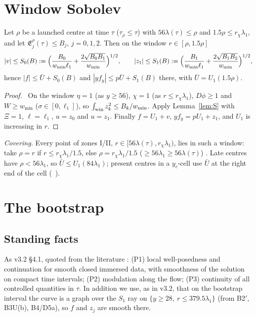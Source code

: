 \documentclass[11pt]{article}
\theoremstyle{definition}\newtheorem{definition}[theorem]{Definition}
\theoremstyle{remark}\newtheorem{remark}[theorem]{Remark}
\newcommand{\key}[1]{\texttt{\detokenize{#1}}}
\newcommand{\E}{\mathfrak E}\newcommand{\B}{\mathfrak B}\newcommand{\Bh}{\hat B}\newcommand{\Eh}{\hat E^A}
\begin{document}
\section{Window Sobolev}\label{sec:W}
\begin{lemma}\label{lem:W}
Let $\rho$ be a launched centre at time $\tau$ ($\tau_\rho\le\tau$) with $56\lambda(\tau)\le\rho$ and $1.5\rho\le r_\chi\lambda_1$, and let $\E^\rho_j(\tau)\le B_j$, $j=0,1,2$. Then on the window $r\in[\rho,1.5\rho]$
\[
|v|\le S_0(B):=\Bigl(\frac{B_0}{w_{\min}\ell_1}+\frac{2\sqrt{B_0B_1}}{w_{\min}}\Bigr)^{1/2},\qquad |z_1|\le S_1(B):=\Bigl(\frac{B_1}{w_{\min}\ell_1}+\frac{2\sqrt{B_1B_2}}{w_{\min}}\Bigr)^{1/2},
\]
hence $|f|\le\bar U+S_0(B)$ and $|yf_y|\le p\bar U+S_1(B)$ there, with $\bar U=U_1(1.5\rho)$.
\end{lemma}
\begin{proof}\tP\ On the window $\eta=1$ (as $y\ge56$), $\chi=1$ (as $r\le r_\chi\lambda_1$), $D\phi\ge1$ and $W\ge w_{\min}$ ($\sigma\in[0,\ell_1]$), so $\int_{\rm win}z_k^2\le B_k/w_{\min}$. Apply Lemma~\ref{lem:S} with $\Xi=1$, $\ell=\ell_1$, $u=z_0$ and $u=z_1$. Finally $f=U_1+v$, $yf_y=pU_1+z_1$, and $U_1$ is increasing in $r$.
\end{proof}
\noindent\emph{Covering.} Every point of zones I/II, $r\in[56\lambda(\tau),r_\chi\lambda_1)$, lies in such a window: take $\rho=r$ if $r\le r_\chi\lambda_1/1.5$, else $\rho=r_\chi\lambda_1/1.5$ ($\ge56\lambda_1\ge56\lambda(\tau)$) \tP. Late centres have $\rho<56\lambda_1$, so $\bar U\le U_1(84\lambda_1)$; present centres in a $y_c$-cell use $\bar U$ at the right end of the cell (\SU\ \key{margins.present_rows[].Ubar}).

\section{The bootstrap}\label{sec:boot}
\subsection{Standing facts}
As v3.2 \S4.1, quoted from the literature \tH: (P1) local well-posedness and continuation for smooth closed immersed data, with smoothness of the solution on compact time intervals; (P2) modulation along the flow; (P3) continuity of all controlled quantities in $\tau$. In addition we use, as in v3.2, that on the bootstrap interval the curve is a graph over the $S_1$ ray on $\{y\ge28,\ r\le379.5\lambda_1\}$ (from B2$'$, B3U(b), B4/D5a), so $f$ and $z_j$ are smooth there.
\end{document}
